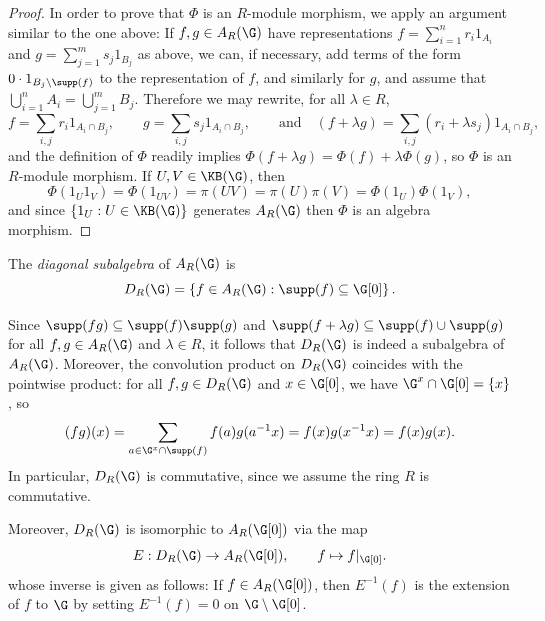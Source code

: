 \begin{proof}
In order to prove that $\Phi$ is an $R$-module morphism, we apply an argument similar to the one above: If $f,g\in A_R(\G)$ have representations $f=\sum_{i=1}^n r_i 1_{A_i}$ and $g=\sum_{j=1}^m s_j 1_{B_j}$ as above, we can, if necessary, add terms of the form $0\cdot 1_{B_j\setminus\supp(f)}$ to the representation of $f$, and similarly for $g$, and assume that $\bigcup_{i=1}^n A_i=\bigcup_{j=1}^m B_j$. Therefore we may rewrite, for all $\lambda\in R$,
\[f=\sum_{i,j}r_i1_{A_i\cap B_j},\qquad g=\sum_{i,j}s_j1_{A_i\cap B_j},\qquad\text{and}\quad(f+\lambda g)=\sum_{i,j}(r_i+\lambda s_j)1_{A_i\cap B_j},\]
and the definition of $\Phi$ readily implies $\Phi(f+\lambda g)=\Phi(f)+\lambda\Phi(g)$, %
so $\Phi$ is an $R$-module morphism. If $U,V\in\KB(\G)$, then
\[\Phi(1_U1_V)=\Phi(1_{UV})=\pi(UV)=\pi(U)\pi(V)=\Phi(1_U)\Phi(1_V),\]
and since $\left\{1_U:U\in\KB(\G)\right\}$ generates $A_R(\G)$ then $\Phi$ is an algebra morphism.\qedhere
\end{proof}

\begin{definition}\label{definitiondiagonalsteinbergalgebra}
The \emph{diagonal subalgebra} of $A_R(\G)$ is
\[D_R(\G)=\left\{f\in A_R(\G):\supp(f)\subseteq\G[0]\right\}.\]
\end{definition}

Since $\supp(fg)\subseteq\supp(f)\supp(g)$ and $\supp(f+\lambda g)\subseteq\supp(f)\cup\supp(g)$ for all $f,g\in A_R(\G)$ and $\lambda\in R$, it follows that $D_R(\G)$ is indeed a subalgebra of $A_R(\G)$. Moreover, the convolution product on $D_R(\G)$ coincides with the pointwise product: for all $f,g\in D_R(\G)$ and $x\in\G[0]$, we have $\G^x\cap\G[0]=\left\{x\right\}$, so
\[(fg)(x)=\sum_{a\in\G^x\cap\supp(f)}f(a)g(a^{-1}x)=f(x)g(x^{-1}x)=f(x)g(x).\]
In particular, $D_R(\G)$ is commutative, since we assume the ring $R$ is commutative.

Moreover, $D_R(\G)$ is isomorphic to $A_R(\G[0])$ via the map
\[E:D_R(\G)\to A_R(\G[0]),\qquad f\mapsto f|_{\G[0]}.\]
whose inverse is given as follows: If $f\in A_R(\G[0])$, then $E^{-1}(f)$ is the extension of $f$ to $\G$ by setting $E^{-1}(f)=0$ on $\G\setminus\G[0]$.

